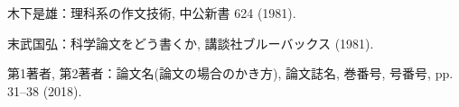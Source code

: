 \documentclass[10pt,twocolumn, a4j]{jsarticle}
\makeatletter
\def\@biblabel#1{#1)}
\makeatother
\begin{document}
\makeatletter
\def\@biblabel#1{#1)}
\makeatother


\begin{thebibliography}{1}

木下是雄：理科系の作文技術, 中公新書 624 (1981).

末武国弘：科学論文をどう書くか, 講談社ブルーバックス (1981).

第1著者, 第2著者：論文名(論文の場合のかき方), 論文誌名, 巻番号, 号番号, pp.
  31--38 (2018).
\end{thebibliography}

%

   
\end{document}
